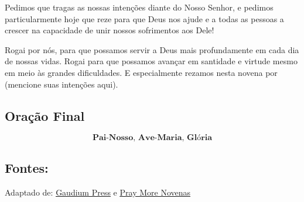 \documentclass[a4paper,14pt]{extarticle} \usepackage[utf8]{inputenc}
\begin{document}
Pedimos que tragas as nossas intenções diante do Nosso Senhor, e pedimos particularmente hoje que reze para que Deus nos ajude e a todas as pessoas a crescer na capacidade de unir nossos sofrimentos aos Dele!

Rogai por nós, para que possamos servir a Deus mais profundamente em cada dia de nossas vidas. Rogai para que possamos avançar em santidade e virtude mesmo em meio às grandes dificuldades. E especialmente rezamos nesta novena por (mencione suas intenções aqui).
    
\underline{}

\subsection{Oração Final}\label{sub:final} %

\[\textbf{Pai-Nosso, Ave-Maria, Glória}\]


\vfill

\begin{center}
\subsection*{Fontes:}
Adaptado de: {\color{blue} \underline{\href{https://gaudiumpress.org/content/82365-padre-engelmar-unzeitig-o-anjo-de-dachau-foi-beatificado/}{Gaudium Press}}} e {\color{blue} \underline{\href{https://www.praymorenovenas.com/blessed-engelmar-unzeitig-novena}{Pray More Novenas}}}
\end{center}
\end{document}
